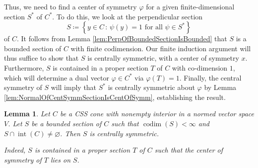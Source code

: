 \documentclass[10pt]{amsart}
\newtheorem{lemma}[thm]{Lemma}
\theoremstyle{definition}
\theoremstyle{remark}
\begin{document}
Thus, we need to find a center of symmetry ${\varphi}$ for a given
fi\-nite-di\-men\-sion\-al section ${{S}^{\ast}}$ of ${C^{\ast}}$.  To
do this, we look at the perpendicular section $$S {\mathrel{\coloneqq}}
{\left\lbrace {y \in C {\,:\,} \text{$\psi(y) = 1$ for all $\psi \in
{{S}^{\ast}}$}} \right\rbrace}$$ of $C$.  It follows from Lemma
\ref{lem:PerpOfBoundedSectionIsBounded} that $S$ is a bounded
section of $C$ with finite codimension.  Our finite induction
argument will thus suffice to show that $S$ is centrally
symmetric, with a center of symmetry $x$.  Furthermore, $S$ is
contained in a proper section $T$ of $C$ with co-dimension $1$,
which will determine a dual vector ${\varphi} \in {{C}^{\ast}}$ via
${\varphi}(T) = 1$.  Finally, the central symmetry of $S$ will imply
that ${{S}^{\ast}}$ is centrally symmetric about ${\varphi}$ by Lemma
\ref{lem:NormalOfCentSymmSectionIsCentOfSymm}, establishing the
result.

\begin{lemma}
   \label{lem:FiniteCodimSectionsAreCentSymm}
   Let $C$ be a CSS cone with nonempty interior in a normed vector
   space $V$.  Let $S$ be a bounded section of $C$ such that
   ${\operatorname{codim}}(S) < \infty$ and $S \cap {\operatorname{int}}(C) \ne {\varnothing}$.  Then
   $S$ is centrally symmetric.
   
   Indeed, $S$ is contained in a proper section $T$ of $C$ such
   that the center of symmetry of $T$ lies on $S$.
\end{lemma}
\end{document}
